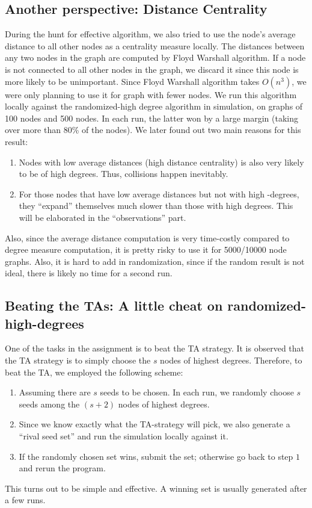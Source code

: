 \documentclass[12pt]{article}
\begin{document}
\subsection{Another perspective: Distance Centrality}
During the hunt for effective algorithm, we also tried to use the node's average distance to all other nodes as a centrality measure locally. The distances between any two nodes in the graph are computed by Floyd Warshall algorithm. If a node is not connected to all other nodes in the graph, we discard it since this node is more likely to be unimportant.
Since Floyd Warshall algorithm takes $O(n^3)$, we were only planning to use it for graph with fewer nodes. We run this algorithm locally against the randomized-high degree algorithm in simulation, on graphs of 100 nodes and 500 nodes. In each run, the latter won by a large margin (taking over more than 80\% of the nodes). We later found out two main reasons for this result:
\begin{enumerate}
\item Nodes with low average distances (high distance centrality) is also very likely to be of high degrees. Thus, collisions happen inevitably. 
\item For those nodes that have low average distances but not with high -degrees, they ``expand'' themselves much slower than those with high degrees. This will be elaborated in the ``observations'' part. 
\end{enumerate}
Also, since the average distance computation is very time-costly compared to degree measure computation, it is pretty risky to use it for 5000/10000 node graphs. Also, it is hard to add in randomization, since if the random result is not ideal, there is likely no time for a second run. 

\subsection{Beating the TAs: A little cheat on randomized-high-degrees}
One of the tasks in the assignment is to beat the TA strategy. It is observed that the TA strategy is to simply choose the $s$ nodes of highest degrees. Therefore, to beat the TA, we employed the following scheme:
\begin{enumerate}
\item Assuming there are $s$ seeds to be chosen. In each run, we randomly choose $s$ seeds among the $(s+2)$ nodes of highest degrees. 
\item Since we know exactly what the TA-strategy will pick, we also generate a ``rival seed set'' and run the simulation locally against it. 
\item If the randomly chosen set wins, submit the set; otherwise go back to step $1$ and rerun the program. 
\end{enumerate}
This turns out to be simple and effective. A winning set is usually generated after a few runs. 
\end{document}
